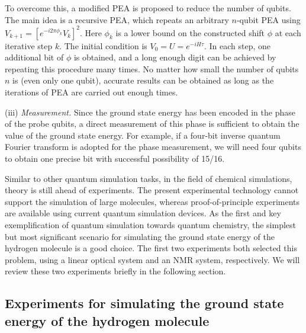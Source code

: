 \documentclass[8.5pt,twoside,twocolumn]{article}
\begin{document}
To overcome this, a modified PEA is proposed\cite{Alan_first}
to reduce the number of qubits.
The main idea is a recursive PEA,
which repeats an arbitrary $n$-qubit PEA
using $V_{k+1}=[e^{-i2 \pi \phi_k}V_k]^2$.
Here $\phi_k$ is a lower bound on the constructed shift $\phi$ at
each iterative step $k$.
The initial condition is $V_{0}=U=e^{-iH\tau}$.
In each step, one additional bit of $\phi$ is obtained,
and a long enough digit can be achieved
by repeating this procedure many times.
No matter how small the number of qubits $n$ is
(even only one qubit), accurate results can be obtained
as long as the iterations of PEA are carried out enough times.

(iii)\emph{ Measurement.}
Since the ground state energy has been encoded
in the phase of the probe qubits,
a direct measurement of this phase is sufficient
to obtain the value of the ground state energy. For example,
if a four-bit inverse quantum Fourier transform is adopted
for the phase measurement,
we will need four qubits
to obtain one precise bit with successful possibility of 15/16.%

Similar to other quantum simulation tasks,
in the field of chemical simulations,
theory is still ahead of experiments.
The present experimental technology cannot support the simulation of large molecules,
whereas proof-of-principle experiments are available
using current quantum simulation devices.
As the first and key exemplification of quantum simulation
towards quantum chemistry, the simplest but most
significant scenario for simulating the ground state energy
of the hydrogen molecule is a good choice.
The first two experiments both selected
this problem, using a linear optical system\cite{Optics_static}
and an NMR system,\cite{NMR_static} respectively.
We will review these two experiments briefly in the following section.

\subsection{Experiments for simulating the ground state energy of the hydrogen molecule}
\end{document}
